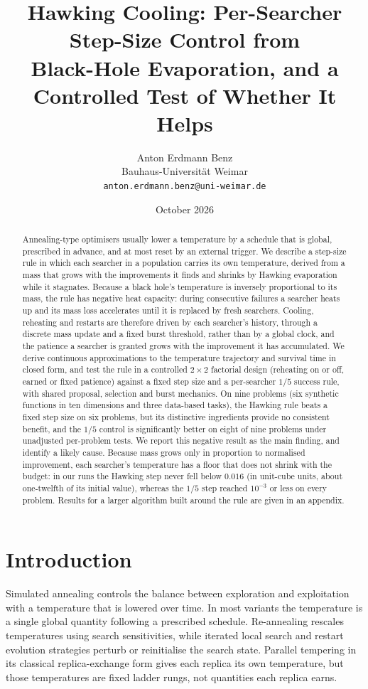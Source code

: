 \documentclass[10pt,a4paper]{article}
\title{Hawking Cooling: Per-Searcher Step-Size Control from\\Black-Hole Evaporation, and a Controlled Test of Whether It Helps}
\author{Anton Erdmann Benz\\Bauhaus-Universit\"at Weimar\\\texttt{anton.erdmann.benz@uni-weimar.de}}
\date{October 2026}
\begin{document}
\maketitle

\begin{abstract}
Annealing-type optimisers usually lower a temperature by a schedule that is
global, prescribed in advance, and at most reset by an external trigger. We
describe a step-size rule in which each searcher in a population carries its own
temperature, derived from a mass that grows with the improvements it finds and
shrinks by Hawking evaporation while it stagnates. Because a black hole's
temperature is inversely proportional to its mass, the rule has negative heat
capacity: during consecutive failures a searcher heats up and its mass loss
accelerates until it is replaced by fresh searchers. Cooling, reheating and
restarts are therefore driven by each searcher's history, through a discrete
mass update and a fixed burst threshold, rather than by a global clock, and the
patience a searcher is granted grows with the improvement it has accumulated.
We derive continuous approximations to the temperature trajectory and survival
time in closed form, and test the rule in a controlled $2\times2$ factorial
design (reheating on or off, earned or fixed patience) against a fixed step size
and a per-searcher $1/5$ success rule, with shared proposal, selection and burst mechanics. On nine
problems (six synthetic functions in ten dimensions and three data-based tasks),
the Hawking rule beats a fixed step size on six problems, but its distinctive
ingredients provide no consistent benefit, and the $1/5$ control is significantly
better on eight of nine problems under unadjusted per-problem tests. We report
this negative result as the main finding, and identify a likely cause. Because
mass grows only in proportion to normalised improvement, each searcher's
temperature has a floor that does not shrink with the budget: in our runs the
Hawking step never fell below $0.016$ (in unit-cube units, about one-twelfth of
its initial value), whereas the $1/5$ step reached $10^{-3}$ or less on every
problem. Results for a larger algorithm built around the rule are given in an
appendix.
\end{abstract}

\section{Introduction}

Simulated annealing \citep{kirkpatrick1983,cerny1985} controls the balance between
exploration and exploitation with a temperature that is lowered over time. In most
variants the temperature is a single global quantity following a prescribed
schedule. Re-annealing \citep{ingber1989} rescales temperatures using search
sensitivities, while iterated local search and restart evolution strategies
\citep{lourenco2003,auger2005} perturb or reinitialise the search state. Parallel
tempering in its classical replica-exchange form \citep{hukushima1996} gives each replica its own
temperature, but those temperatures are fixed ladder rungs, not quantities each
replica earns.
\end{document}
